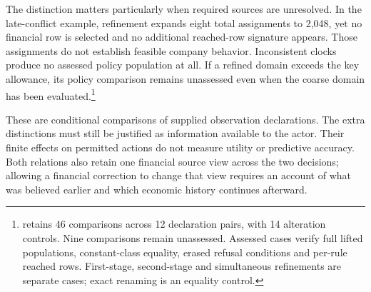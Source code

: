 The distinction matters particularly when required sources are unresolved. In the late-conflict example, refinement expands eight total assignments to 2,048, yet no financial row is selected and no additional reached-row signature appears. Those assignments do not establish feasible company behavior. Inconsistent clocks produce no assessed policy population at all. If a refined domain exceeds the key allowance, its policy comparison remains unassessed even when the coarse domain has been evaluated.\footnote{ retains 46 comparisons across 12 declaration pairs, with 14 alteration controls. Nine comparisons remain unassessed. Assessed cases verify full lifted populations, constant-class equality, erased refusal conditions and per-rule reached rows. First-stage, second-stage and simultaneous refinements are separate cases; exact renaming is an equality control.}

\enlargethispage{2\baselineskip}
These are conditional comparisons of supplied observation declarations. The extra distinctions must still be justified as information available to the actor. Their finite effects on permitted actions do not measure utility or predictive accuracy. Both relations also retain one financial source view across the two decisions; allowing a financial correction to change that view requires an account of what was believed earlier and which economic history continues afterward.
